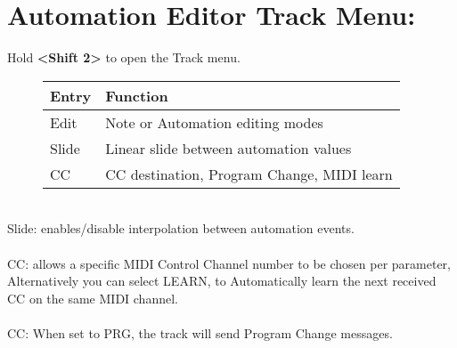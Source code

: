 \section{Automation Editor Track Menu:}
Hold \textbf{<Shift 2>} to open the Track menu.
\begin{figure}[hb]
    \begin{tabular}{|l|l|}
    \hline
    \rowcolor[HTML]{C0C0C0}
    Entry        & Function \\ \hline
    Edit         & Note or Automation editing modes\\ \hline
    Slide      & Linear slide between automation values \\ \hline
    CC         & CC destination, Program Change,  MIDI learn \\ \hline
    \end{tabular}
\end{figure}
\\
Slide: enables/disable interpolation between automation events.\\\\
CC: allows a specific MIDI Control Channel number to be chosen per parameter, Alternatively you can select LEARN, to Automatically learn the next received CC on the same MIDI channel.\\\\
CC: When set to PRG, the track will send Program Change messages.


